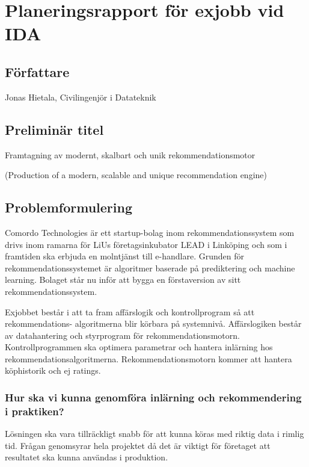 \documentclass[11pt]{article}
\begin{document}
\section*{Planeringsrapport för exjobb vid IDA}

\subsection*{Författare}

Jonas Hietala, Civilingenjör i Datateknik

\subsection*{Preliminär titel}

Framtagning av modernt, skalbart och unik rekommendationsmotor

(Production of a modern, scalable and unique recommendation engine)

\subsection*{Problemformulering}

Comordo Technologies är ett startup-bolag inom rekommendationssystem som drivs inom ramarna för LiUs företagsinkubator LEAD i Linköping och som i framtiden ska erbjuda en molntjänst till e-handlare. Grunden för rekommendationssystemet är algoritmer baserade på prediktering och machine learning. Bolaget står nu inför att bygga en förstaversion av sitt rekommendationssystem.

Exjobbet består i att ta fram affärslogik och kontrollprogram så att rekommendations- algoritmerna blir körbara på systemnivå. Affärslogiken består av datahantering och styrprogram för rekommendationsmotorn. Kontrollprogrammen ska optimera parametrar och hantera inlärning hos rekommendationsalgoritmerna. Rekommendationsmotorn kommer att hantera köphistorik och ej ratings.


\subsubsection*{Hur ska vi kunna genomföra inlärning och rekommendering i praktiken?}

Lösningen ska vara tillräckligt snabb för att kunna köras med riktig data i rimlig tid. Frågan genomsyrar hela projektet då det är viktigt för företaget att resultatet ska kunna användas i produktion.
\end{document}
